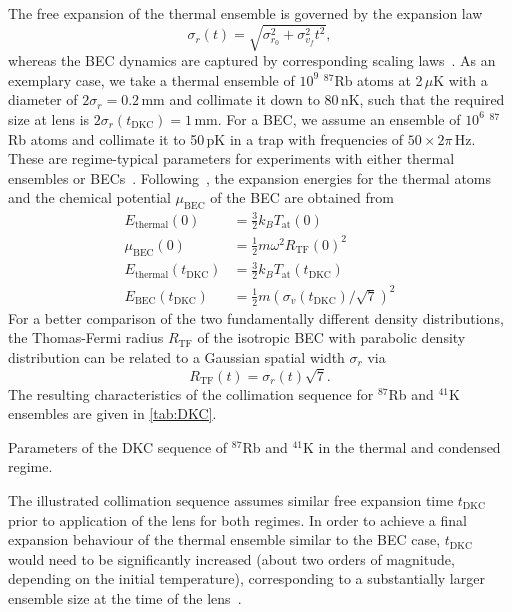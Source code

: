 %
The free expansion of the thermal ensemble is governed by the expansion law
\begin{equation}
    \label{eq:expansion-law}
    \sigma_r (t)=\sqrt{\sigma_{r_0}^2+\sigma_{v_f}^2t^2},
\end{equation}
whereas the BEC dynamics are captured by corresponding scaling laws~\cite{Castin1996}. As an exemplary case, we take a thermal ensemble of $10^9$ $^{87}$Rb atoms at 2\,$\mu$K with a diameter of $2\sigma_r=0.2$\,mm and collimate it down to 80\,nK, such that the required size at lens is $2 \sigma_r(t_\text{DKC})=1$\,mm. For a BEC, we assume an ensemble of $10^6$ $^{87}$Rb atoms and collimate it to 50\,pK in a trap with frequencies of $50\times 2\pi$\,Hz. These are regime-typical parameters for experiments with either thermal ensembles or BECs~\cite{Loriani2019,Mntinga2013,Kovachy2015}. Following~\cite{Loriani2019}, the expansion energies for the thermal atoms and the chemical potential $\mu_\text{BEC}$ of the BEC are obtained from
\begin{align}
    E_\text{thermal}(0)&=\tfrac{3}{2}k_B T_\text{at}(0)\\
    \mu_\text{BEC}(0)&=\tfrac{1}{2} m \omega^2 R_\text{TF}(0)^2\\
    E_\text{thermal}(t_\text{DKC})&=\tfrac{3}{2} k_B T_\text{at}(t_\text{DKC})\\
    E_\text{BEC}(t_\text{DKC})&=\tfrac{1}{2}m\left(\sigma_v(t_\text{DKC})/\sqrt{7}\right)^2
\end{align}
For a better comparison of the two fundamentally dif\-fe\-rent density distributions, the Thomas-Fermi radius $R_\text{TF}$ of the isotropic BEC with parabolic density distribution can be related to a Gaussian spatial width $\sigma_r$ via~\cite{Corgier2018} 
\begin{equation}\label{eq:gauss-parabolic-width}
    R_\text{TF}(t)=\sigma_r(t)\sqrt{7}.
\end{equation}
The resulting characteristics of the collimation sequence for $^{87}$Rb and $^{41}$K ensembles are given in \autoref{tab:DKC}.
%
\begin{center}
    \begin{table}[h!]
    \caption{Parameters of the DKC sequence of $^{87}$Rb and $^{41}$K in the thermal and condensed regime.}
    \centering
    
    \label{tab:DKC}
    \end{table}
\end{center}
%
The illustrated collimation sequence assumes similar free expansion time $t_\text{DKC}$ prior to application of the lens for both regimes. In order to achieve a final expansion behaviour of the thermal ensemble similar to the BEC case, $t_\text{DKC}$ would need to be significantly increased (about two orders of magnitude, depending on the initial temperature), corresponding to a substantially larger ensemble size at the time of the lens~\cite{Loriani2019}.
